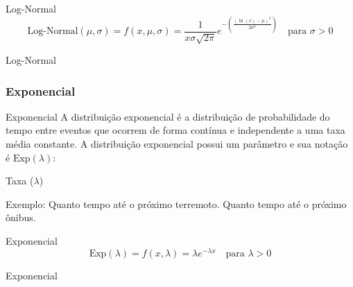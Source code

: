 \begin{frame}{Log-Normal}
	$$\text{Log-Normal}(\mu,\sigma) = f(x, \mu, \sigma) = \frac{1}{x \sigma{\sqrt{2\pi}}}e^{-\left({\frac {(\ln(x)-\mu)^2}{2 \sigma^2 }}\right)} \quad \text{para $\sigma > 0$}$$
\end{frame}

\begin{frame}{Log-Normal}
	\centering
\end{frame}

\subsubsection{Exponencial}
\begin{frame}{Exponencial}
	A distribuição exponencial é a distribuição de probabilidade do tempo entre
	eventos que ocorrem de forma contínua e independente a uma taxa média constante.
	\vfill
	A distribuição exponencial possui um parâmetro e sua notação é
	$\text{Exp}(\lambda)$:
	\begin{vfilleditems}
		\item Taxa ($\lambda$)
	\end{vfilleditems}
	\vfill
	Exemplo: Quanto tempo até o próximo terremoto. Quanto tempo até o próximo ônibus.
\end{frame}

\begin{frame}{Exponencial}
	$$\text{Exp}(\lambda) = f(x, \lambda) = \lambda e^{-\lambda x} \quad \text{para $\lambda > 0$}$$
\end{frame}

\begin{frame}{Exponencial}
	\centering
\end{frame}

